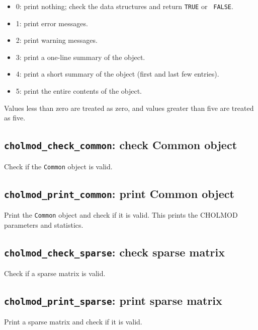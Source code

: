 \documentclass[11pt]{article}
\begin{document}
\begin{itemize}
\item 0: print nothing; check the data structures and return {\tt TRUE} or {\tt
FALSE}.
\item 1: print error messages.
\item 2: print warning messages.
\item 3: print a one-line summary of the object.
\item 4: print a short summary of the object (first and last few entries).
\item 5: print the entire contents of the object.
\end{itemize}
Values less than zero are treated as zero, and values greater than five are
treated as five.

\subsection{{\tt cholmod\_check\_common}: check Common object}


Check if the {\tt Common} object is valid.

\subsection{{\tt cholmod\_print\_common}: print Common object}


Print the {\tt Common} object and check if it is valid.
This prints the CHOLMOD parameters and statistics.

\subsection{{\tt cholmod\_check\_sparse}: check sparse matrix}


Check if a sparse matrix is valid.

\subsection{{\tt cholmod\_print\_sparse}: print sparse matrix}


Print a sparse matrix and check if it is valid.
\end{document}
